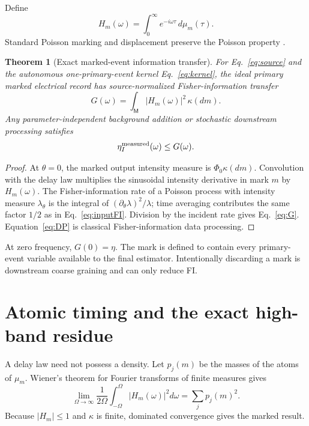 \documentclass[aps,prapplied,preprint,nofootinbib]{revtex4-2}
\newtheorem{theorem}{Theorem}
\newcommand{\M}{\mathsf M}
\begin{document}
Define
\begin{equation}
H_m(\omega)=\int_0^\infty e^{-i\omega\tau}\,d\mu_m(\tau).
\end{equation}
Standard Poisson marking and displacement preserve the Poisson property \cite{Kingman1993,DaleyVereJones2003}.

\begin{theorem}[Exact marked-event information transfer]
For Eq.~\eqref{eq:source} and the autonomous one-primary-event kernel Eq.~\eqref{eq:kernel}, the ideal primary marked electrical record has source-normalized Fisher-information transfer
\begin{equation}
\boxed{
G(\omega)=\int_{\M}|H_m(\omega)|^2\,\kappa(dm).}
\label{eq:G}
\end{equation}
Any parameter-independent background addition or stochastic downstream processing satisfies
\begin{equation}
\eta_I^{\rm measured}(\omega)\le G(\omega).
\label{eq:DP}
\end{equation}
\end{theorem}

\begin{proof}
At $\theta=0$, the marked output intensity measure is $\Phi_0\kappa(dm)$. Convolution with the delay law multiplies the sinusoidal intensity derivative in mark $m$ by $H_m(\omega)$. The Fisher-information rate of a Poisson process with intensity measure $\lambda_\theta$ is the integral of $(\partial_\theta\lambda)^2/\lambda$; time averaging contributes the same factor $1/2$ as in Eq.~\eqref{eq:inputFI}. Division by the incident rate gives Eq.~\eqref{eq:G}. Equation~\eqref{eq:DP} is classical Fisher-information data processing.
\end{proof}

At zero frequency, $G(0)=\eta$. The mark is defined to contain every primary-event variable available to the final estimator. Intentionally discarding a mark is downstream coarse graining and can only reduce FI.

\section{Atomic timing and the exact high-band residue}

A delay law need not possess a density. Let $p_j(m)$ be the masses of the atoms of $\mu_m$. Wiener's theorem for Fourier transforms of finite measures \cite{Katznelson2004} gives
\begin{equation}
\lim_{\Omega\to\infty}\frac{1}{2\Omega}
\int_{-\Omega}^{\Omega}|H_m(\omega)|^2d\omega
=\sum_jp_j(m)^2.
\end{equation}
Because $|H_m|\le1$ and $\kappa$ is finite, dominated convergence gives the marked result.
\end{document}
